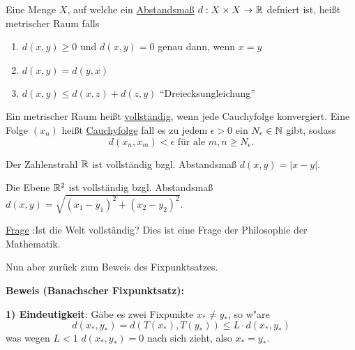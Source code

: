 \documentclass[a4paper,10pt]{article}
\begin{document}
\begin{defi}
 Eine Menge $X$, auf welche ein \underline{Abstandsmaß} $d: X \times X \to \mathbb{R}$ defniert ist,
 heißt metrischer Raum falls
 \begin{enumerate}
  \item $d(x, y) \geq 0 $ und $d(x,y) =0$ genau dann, wenn $x=y$
  \item $d(x,y) = d(y,x)$
  \item $d(x,y) \leq d(x,z) + d(z,y)$ ``Dreiecksungleichung''
 \end{enumerate}

\end{defi}

\begin{defi}
 Ein metrischer Raum heißt \underline{vollständig}, wenn jede Cauchyfolge konvergiert.
 Eine Folge $(x_n)$ heißt \underline{Cauchyfolge} fall es zu jedem $\epsilon > 0$ ein 
 $N_\epsilon \in \mathbb{N}$ gibt, sodass
 \[
  d(x_n, x_m) < \epsilon \text{ für ale } m,n \geq N_\epsilon.
 \]

\end{defi}

\begin{expl*}
 Der Zahlenstrahl $\mathbb{R}$ ist vollständig bzgl. Abstandsmaß $d(x,y)= |x - y|$.
 
 \noindent
 Die Ebene $\mathbb{R}^2$ ist vollständig bzgl. Abstandsmaß $d(x,y) = \sqrt{(x_1 - y_1)^2 + (x_2 - y_2)^2}$.
\end{expl*}

\underline{Frage} :Ist die Welt vollständig? Dies ist eine Frage der Philosophie der Mathematik.

Nun aber zurück zum Beweis des Fixpunktsatzes.

\vspace{0.5cm}
\noindent
\textbf{Beweis (Banachscher Fixpunktsatz):}

 \vspace{.2cm}
 \noindent
 \textbf{1) Eindeutigkeit}:
 Gäbe es zwei Fixpunkte $x_* \neq y_*$, so w"are \newline
 \[d(x_*, y_*) = d(T(x_*), T(y_*)) \leq L \cdot d(x_*, y_*)\]
 was wegen $L< 1$ $d(x_*,y_*) =0$ nach sich zieht, also $x_*= y_*$.
\end{document}

